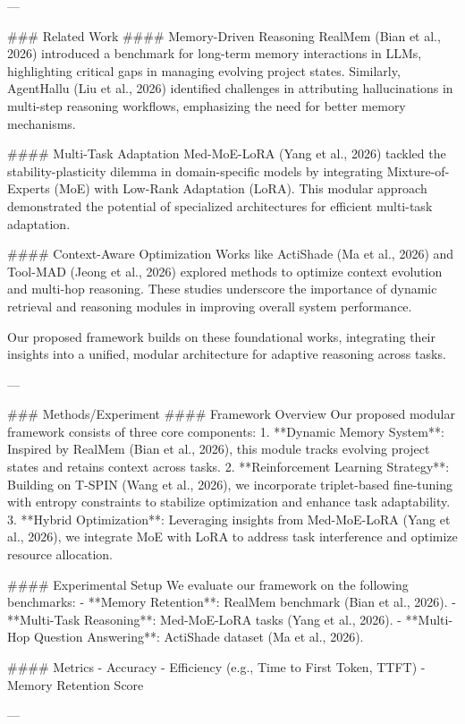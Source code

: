 ---

### Related Work  
#### Memory-Driven Reasoning  
RealMem (Bian et al., 2026) introduced a benchmark for long-term memory interactions in LLMs, highlighting critical gaps in managing evolving project states. Similarly, AgentHallu (Liu et al., 2026) identified challenges in attributing hallucinations in multi-step reasoning workflows, emphasizing the need for better memory mechanisms.

#### Multi-Task Adaptation  
Med-MoE-LoRA (Yang et al., 2026) tackled the stability-plasticity dilemma in domain-specific models by integrating Mixture-of-Experts (MoE) with Low-Rank Adaptation (LoRA). This modular approach demonstrated the potential of specialized architectures for efficient multi-task adaptation.

#### Context-Aware Optimization  
Works like ActiShade (Ma et al., 2026) and Tool-MAD (Jeong et al., 2026) explored methods to optimize context evolution and multi-hop reasoning. These studies underscore the importance of dynamic retrieval and reasoning modules in improving overall system performance.

Our proposed framework builds on these foundational works, integrating their insights into a unified, modular architecture for adaptive reasoning across tasks.

---

### Methods/Experiment  
#### Framework Overview  
Our proposed modular framework consists of three core components:  
1. **Dynamic Memory System**: Inspired by RealMem (Bian et al., 2026), this module tracks evolving project states and retains context across tasks.  
2. **Reinforcement Learning Strategy**: Building on T-SPIN (Wang et al., 2026), we incorporate triplet-based fine-tuning with entropy constraints to stabilize optimization and enhance task adaptability.  
3. **Hybrid Optimization**: Leveraging insights from Med-MoE-LoRA (Yang et al., 2026), we integrate MoE with LoRA to address task interference and optimize resource allocation.

#### Experimental Setup  
We evaluate our framework on the following benchmarks:  
- **Memory Retention**: RealMem benchmark (Bian et al., 2026).  
- **Multi-Task Reasoning**: Med-MoE-LoRA tasks (Yang et al., 2026).  
- **Multi-Hop Question Answering**: ActiShade dataset (Ma et al., 2026).  

#### Metrics  
- Accuracy  
- Efficiency (e.g., Time to First Token, TTFT)  
- Memory Retention Score  

---

